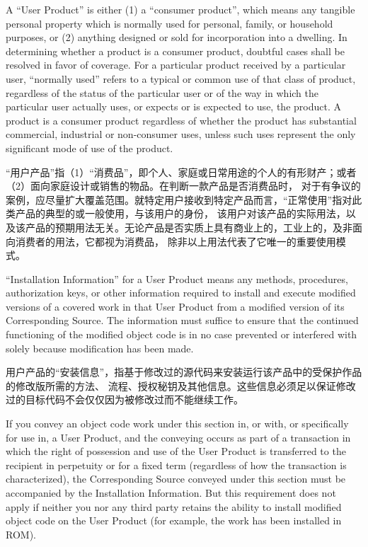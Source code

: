 \documentclass[11pt]{article}
\begin{document}
\begin{enumerate}
        A ``User Product'' is either (1) a ``consumer product'', which means any
        tangible personal property which is normally used for personal, family,
        or household purposes, or (2) anything designed or sold for incorporation
        into a dwelling.  In determining whether a product is a consumer product,
        doubtful cases shall be resolved in favor of coverage.  For a particular
        product received by a particular user, ``normally used'' refers to a
        typical or common use of that class of product, regardless of the status
        of the particular user or of the way in which the particular user
        actually uses, or expects or is expected to use, the product.  A product
        is a consumer product regardless of whether the product has substantial
        commercial, industrial or non-consumer uses, unless such uses represent
        the only significant mode of use of the product.

        “用户产品”指（1）“消费品”，即个人、家庭或日常用途的个人的有形财产；或者（2）面向家庭设计或销售的物品。在判断一款产品是否消费品时，
        对于有争议的案例，应尽量扩大覆盖范围。就特定用户接收到特定产品而言，“正常使用”指对此类产品的典型的或一般使用，与该用户的身份，
        该用户对该产品的实际用法，以及该产品的预期用法无关。无论产品是否实质上具有商业上的，工业上的，及非面向消费者的用法，它都视为消费品，
        除非以上用法代表了它唯一的重要使用模式。


        ``Installation Information'' for a User Product means any methods,
        procedures, authorization keys, or other information required to install
        and execute modified versions of a covered work in that User Product from
        a modified version of its Corresponding Source.  The information must
        suffice to ensure that the continued functioning of the modified object
        code is in no case prevented or interfered with solely because
        modification has been made.

        用户产品的“安装信息”，指基于修改过的源代码来安装运行该产品中的受保护作品的修改版所需的方法、
        流程、授权秘钥及其他信息。这些信息必须足以保证修改过的目标代码不会仅仅因为被修改过而不能继续工作。

        If you convey an object code work under this section in, or with, or
        specifically for use in, a User Product, and the conveying occurs as
        part of a transaction in which the right of possession and use of the
        User Product is transferred to the recipient in perpetuity or for a
        fixed term (regardless of how the transaction is characterized), the
        Corresponding Source conveyed under this section must be accompanied
        by the Installation Information.  But this requirement does not apply
        if neither you nor any third party retains the ability to install
        modified object code on the User Product (for example, the work has
        been installed in ROM).


\end{enumerate}
\end{document}
